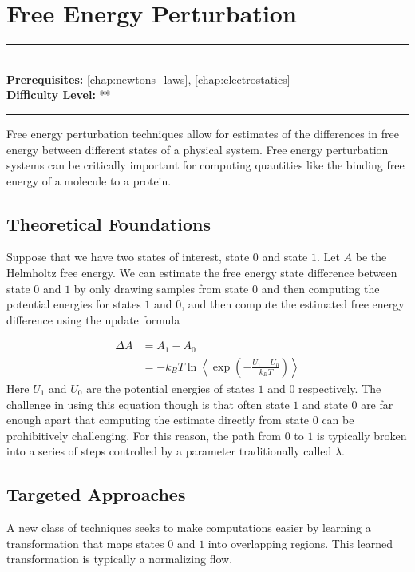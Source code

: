 \documentclass[book.tex]{subfiles}
\begin{document}
\chapter{Free Energy Perturbation}
\label{chap:fep}
\noindent\rule{11cm}{0.4pt} \\
\textbf{Prerequisites:} \autoref{chap:newtons_laws}, \autoref{chap:electrostatics}  \\
\textbf{Difficulty Level:} ** \\
\noindent\rule{11cm}{0.4pt}
\vspace{5mm}

Free energy perturbation techniques allow for estimates of the differences in free energy between different states of a physical system. Free energy perturbation systems can be critically important for computing quantities like the binding free energy of a molecule to a protein.

\section{Theoretical Foundations}

Suppose that we have two states of interest, state $0$ and state $1$. Let $A$ be the Helmholtz free energy. We can estimate the free energy state difference between state $0$ and $1$ by only drawing samples from state $0$ and then computing the potential energies for states $1$ and $0$, and then compute the estimated free energy difference using the update formula

\begin{align}
\Delta A &= A_1 - A_0 \\
&= -k_B T \ln \left \langle \exp \left (  -\frac{U_1 - U_0}{k_B T} \right ) \right \rangle
\end{align}
Here $U_1$ and $U_0$ are the potential energies of states $1$ and $0$ respectively. The challenge in using this equation though is that often state $1$ and state $0$ are far enough apart that computing the estimate directly from state $0$ can be prohibitively challenging. For this reason, the path from $0$ to $1$ is typically broken into a series of steps controlled by a parameter traditionally called $\lambda$.

\section{Targeted Approaches}

A new class of techniques seeks to make computations easier by learning a transformation that maps states $0$ and $1$ into overlapping regions. This learned transformation is typically a normalizing flow.
\end{document}

